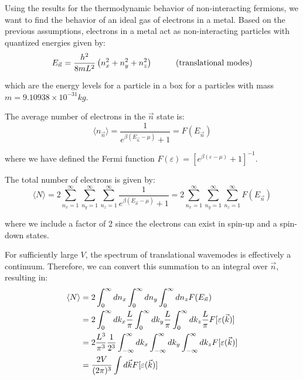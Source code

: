 \documentclass[book.tex]{subfiles}
\begin{document}
Using the results for the thermodynamic behavior of non-interacting fermions, we want to find the behavior of an ideal gas of electrons in a metal. Based on the previous assumptions, electrons in a metal act as non-interacting particles with quantized energies given by:
\begin{equation}
E_{\vec{n}} = \frac{h^2}{8mL^2}\left(n_x^2+n_y^2+n_z^2\right) \hspace{1.0cm} \text{(translational modes)} \notag
\end{equation}

\noindent which are the energy levels for a particle in a box for a particles with mass $m=9.10938\times 10^{-31} kg$.

The average number of electrons in the $\vec{n}$ state is:
\begin{equation}\label{Eq7}
\langle n_{\vec{n}} \rangle = \frac{1}{e^{\beta (E_{\vec{n}} - \mu)} + 1} = F(E_{\vec{n}})
\end{equation}

\noindent where we have defined the Fermi function $F(\varepsilon) = \left[e^{\beta(\varepsilon - \mu)} + 1 \right] ^{-1}$.

The total number of electrons is given by:
\begin{equation}\label{Eq8}
\langle N \rangle = 2 \sum_{n_x = 1}^\infty \sum_{n_y = 1}^\infty \sum_{n_z = 1}^\infty \frac{1}{e^{\beta (E_{\vec{n}} - \mu)} + 1} =  2 \sum_{n_x = 1}^\infty \sum_{n_y = 1}^\infty \sum_{n_z = 1}^\infty F(E_{\vec{n}})
\end{equation}

\noindent where we include a factor of 2 since the electrons can exist in spin-up and a spin-down states.

For sufficiently large $V$, the spectrum of translational wavemodes is effectively a continuum. Therefore, we can convert this summation to an integral over $\vec{n}$, resulting in:
\begin{align}
\langle N \rangle &= 2 \int_0^\infty dn_x \int_0^\infty dn_y \int_0^\infty dn_z F(E_{\vec{n}}) \notag\\
&= 2 \int_0^\infty dk_x \frac{L}{\pi} \int_0^\infty dk_y \frac{L}{\pi} \int_0^\infty dk_z \frac{L}{\pi} F[\varepsilon (\vec{k})] \notag\\
&= 2 \frac{L^3}{\pi^3} \frac{1}{2^3} \int_{-\infty}^\infty dk_x \int_{-\infty}^\infty dk_y \int_{-\infty}^\infty dk_z F[\varepsilon (\vec{k})] \notag\\ 
&= \frac{2V}{(2\pi)^3} \int d\vec{k} F[\varepsilon (\vec{k})] \notag
\end{align}
\end{document}
